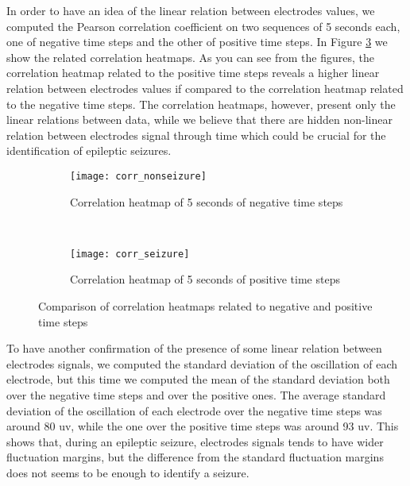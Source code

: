 In order to have an idea of the linear relation between electrodes values, we computed the Pearson correlation coefficient on two sequences of 5 seconds each, one of negative time steps and the other of positive time steps. In Figure \ref{fig:corr_heatmaps} we show the related correlation heatmaps. As you can see from the figures, the correlation heatmap related to the positive time steps reveals a higher linear relation between electrodes values if compared to the correlation heatmap related to the negative time steps. The correlation heatmaps, however, present only the linear relations between data, while we believe that there are hidden non-linear relation between electrodes signal through time which could be crucial for the identification of epileptic seizures.

\begin{figure}[htbp]
    \centering
    \begin{subfigure}[t]{0.49\textwidth}
		\texttt{[image: corr\_nonseizure]}
        \caption{Correlation heatmap of 5 seconds of negative time steps}
        \label{fig:corr_nonseizure}
	\end{subfigure}%
	~
	\begin{subfigure}[t]{0.49\textwidth}
		\texttt{[image: corr\_seizure]}
        \caption{Correlation heatmap of 5 seconds of positive time steps}
        \label{fig:corr_seizure}
    \end{subfigure}
    \caption{Comparison of correlation heatmaps related to negative and positive time steps}
    \label{fig:corr_heatmaps}
\end{figure}

To have another confirmation of the presence of some linear relation between electrodes signals, we computed the standard deviation of the oscillation of each electrode, but this time we computed the mean of the standard deviation both over the negative time steps and over the positive ones. The average standard deviation of the oscillation of each electrode over the negative time steps was around 80 \acs{uv}, while the one over the positive time steps was around 93 \acs{uv}. This shows that, during an epileptic seizure, electrodes signals tends to have wider fluctuation margins, but the difference from the standard fluctuation margins does not seems to be enough to identify a seizure.


